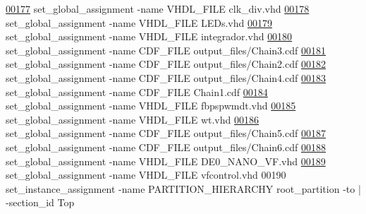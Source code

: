 \begin{DoxyCode}
\hypertarget{_d_e0___n_a_n_o___v_f_8qsf_source_l00177}{}\hyperlink{_d_e0___n_a_n_o___v_f_8qsf_a05b1d81caa4070ec80efbe3629657ac1}{00177} set\_global\_assignment -name VHDL\_FILE clk\_div.vhd
\hypertarget{_d_e0___n_a_n_o___v_f_8qsf_source_l00178}{}\hyperlink{_d_e0___n_a_n_o___v_f_8qsf_a56911a1b536f03388a57c27f160f1c37}{00178} set\_global\_assignment -name VHDL\_FILE LEDs.vhd
\hypertarget{_d_e0___n_a_n_o___v_f_8qsf_source_l00179}{}\hyperlink{_d_e0___n_a_n_o___v_f_8qsf_af3ef501ea8035dd99b04e8f007c19e49}{00179} set\_global\_assignment -name VHDL\_FILE integrador.vhd
\hypertarget{_d_e0___n_a_n_o___v_f_8qsf_source_l00180}{}\hyperlink{_d_e0___n_a_n_o___v_f_8qsf_aedf274921e323e9b7cb1b48433456e0a}{00180} set\_global\_assignment -name CDF\_FILE output\_files/Chain3.cdf
\hypertarget{_d_e0___n_a_n_o___v_f_8qsf_source_l00181}{}\hyperlink{_d_e0___n_a_n_o___v_f_8qsf_a2d1c22823500d7885cd1036c1158b03a}{00181} set\_global\_assignment -name CDF\_FILE output\_files/Chain2.cdf
\hypertarget{_d_e0___n_a_n_o___v_f_8qsf_source_l00182}{}\hyperlink{_d_e0___n_a_n_o___v_f_8qsf_af1c3235584e167ad7e0c5a520effe51c}{00182} set\_global\_assignment -name CDF\_FILE output\_files/Chain4.cdf
\hypertarget{_d_e0___n_a_n_o___v_f_8qsf_source_l00183}{}\hyperlink{_d_e0___n_a_n_o___v_f_8qsf_af3518fa9a026fef1e4d8e13067bf0784}{00183} set\_global\_assignment -name CDF\_FILE Chain1.cdf
\hypertarget{_d_e0___n_a_n_o___v_f_8qsf_source_l00184}{}\hyperlink{_d_e0___n_a_n_o___v_f_8qsf_a35eb27ca85461145af829d3dab4b9e86}{00184} set\_global\_assignment -name VHDL\_FILE fbpspwmdt.vhd
\hypertarget{_d_e0___n_a_n_o___v_f_8qsf_source_l00185}{}\hyperlink{_d_e0___n_a_n_o___v_f_8qsf_a5e8d33ead4fe819f1814b480339372c5}{00185} set\_global\_assignment -name VHDL\_FILE wt.vhd
\hypertarget{_d_e0___n_a_n_o___v_f_8qsf_source_l00186}{}\hyperlink{_d_e0___n_a_n_o___v_f_8qsf_afb4148a20ada7ab6f9e684c529b0efdd}{00186} set\_global\_assignment -name CDF\_FILE output\_files/Chain5.cdf
\hypertarget{_d_e0___n_a_n_o___v_f_8qsf_source_l00187}{}\hyperlink{_d_e0___n_a_n_o___v_f_8qsf_a6349d59d34ea7e726d096dd1926c101c}{00187} set\_global\_assignment -name CDF\_FILE output\_files/Chain6.cdf
\hypertarget{_d_e0___n_a_n_o___v_f_8qsf_source_l00188}{}\hyperlink{_d_e0___n_a_n_o___v_f_8qsf_a552d1302330e0a92738409f036af10c3}{00188} set\_global\_assignment -name VHDL\_FILE DE0\_NANO\_VF.vhd
\hypertarget{_d_e0___n_a_n_o___v_f_8qsf_source_l00189}{}\hyperlink{_d_e0___n_a_n_o___v_f_8qsf_a1adf907232e2d4eaf1301083cbfe63f7}{00189} set\_global\_assignment -name VHDL\_FILE vfcontrol.vhd
00190 set\_instance\_assignment -name PARTITION\_HIERARCHY root\_partition -to | -section\_id Top
\end{DoxyCode}
